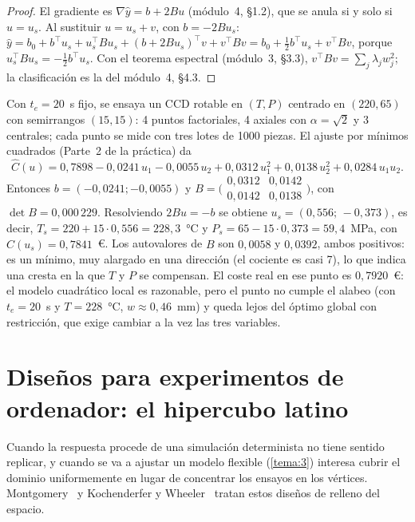 \begin{proof}
El gradiente es $\nabla\hat y=b+2Bu$ (módulo~4, §1.2), que se anula si y solo si $u=u_s$. Al sustituir $u=u_s+v$, con $b=-2Bu_s$:
$\hat y=b_0+b^\top u_s+u_s^\top Bu_s+(b+2Bu_s)^\top v+v^\top Bv=b_0+\tfrac12b^\top u_s+v^\top Bv$, porque $u_s^\top Bu_s=-\tfrac12 b^\top u_s$. Con el teorema espectral (módulo~3, §3.3), $v^\top Bv=\sum_j\lambda_jw_j^2$; la clasificación es la del módulo~4, §4.3.
\end{proof}

\begin{ejemplo}\label{ej:ccd}
Con $t_e=20$~s fijo, se ensaya un CCD rotable en $(T,P)$ centrado en $(220,65)$ con semirrangos $(15,15)$: 4 puntos factoriales, 4 axiales con $\alpha=\sqrt2$ y 3 centrales; cada punto se mide con tres lotes de 1000 piezas. El ajuste por mínimos cuadrados (Parte~2 de la práctica) da
\[
\hat C(u)=0{,}7898-0{,}0241\,u_1-0{,}0055\,u_2+0{,}0312\,u_1^2+0{,}0138\,u_2^2+0{,}0284\,u_1u_2 .
\]
Entonces $b=(-0{,}0241;-0{,}0055)$ y $B=\bigl(\begin{smallmatrix}0{,}0312&0{,}0142\\0{,}0142&0{,}0138\end{smallmatrix}\bigr)$, con $\det B=0{,}000\,229$. Resolviendo $2Bu=-b$ se obtiene $u_s=(0{,}556;\,-0{,}373)$, es decir, $T_s=220+15\cdot0{,}556=228{,}3$~°C y $P_s=65-15\cdot0{,}373=59{,}4$~MPa, con $\hat C(u_s)=0{,}7841$~€. Los autovalores de $B$ son $0{,}0058$ y $0{,}0392$, ambos positivos: es un mínimo, muy alargado en una dirección (el cociente es casi 7), lo que indica una cresta en la que $T$ y $P$ se compensan. El coste real en ese punto es $0{,}7920$~€: el modelo cuadrático local es razonable, pero el punto no cumple el alabeo (con $t_e=20$~s y $T=228$~°C, $w\approx 0{,}46$~mm) y queda lejos del óptimo global con restricción, que exige cambiar a la vez las tres variables.
\end{ejemplo}

\section{Diseños para experimentos de ordenador: el hipercubo latino}

Cuando la respuesta procede de una simulación determinista no tiene sentido replicar, y cuando se va a ajustar un modelo flexible (\cref{tema:3}) interesa cubrir el dominio uniformemente en lugar de concentrar los ensayos en los vértices. Montgomery~\cite[§11.5]{montgomery} y Kochenderfer y Wheeler~\cite[§13.3–13.5]{kw} tratan estos diseños de relleno del espacio.

